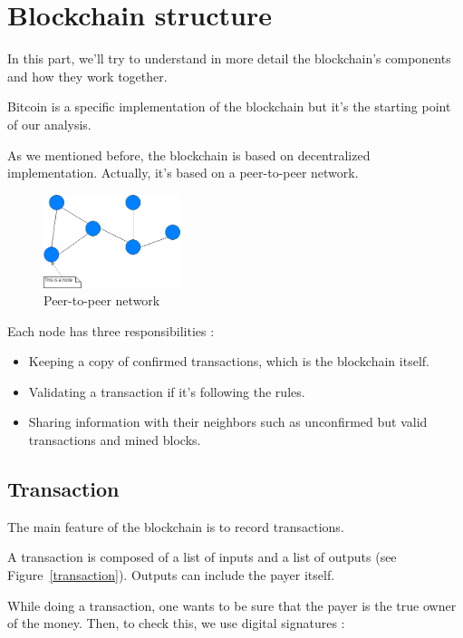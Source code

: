 \section{Blockchain structure}

In this part, we'll try to understand in more detail the blockchain's components and how they work together.

Bitcoin is a specific implementation of the blockchain but it's the starting point of our analysis. \newline

As we mentioned before, the blockchain is based on decentralized implementation. Actually, it's based on a peer-to-peer network.

\begin{figure}[h]
\centering
\includegraphics[width=4cm]{Figures/network}
\caption{Peer-to-peer network}
\end{figure}
\medskip

Each node has three responsibilities :

\begin{itemize}
  \item Keeping a copy of confirmed transactions, which is the blockchain itself.
  \item Validating a transaction if it's following the rules.
  \item Sharing information with their neighbors such as unconfirmed but valid transactions and mined blocks.
\end{itemize}

\clearpage

  \subsection{Transaction}

The main feature of the blockchain is to record transactions.

A transaction is composed of a list of inputs and a list of outputs (see Figure~\ref{transaction}). Outputs can include the payer itself. \newline

While doing a transaction, one wants to be sure that the payer is the true owner of the money. Then, to check this,  we use digital signatures :

